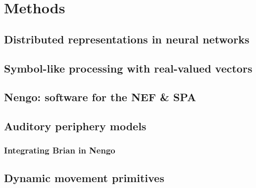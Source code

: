 \chapter{Methods}



\section{Distributed representations in neural networks}



\section{Symbol-like processing with real-valued vectors}





\section{Nengo: software for the NEF \& SPA}

\section{Auditory periphery models}

\subsection{Integrating Brian in Nengo}

\section{Dynamic movement primitives}
